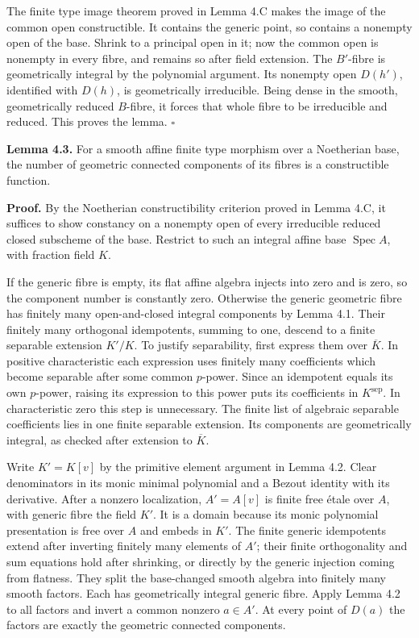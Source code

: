 \documentclass[11pt,a4paper,openany]{report}
\newcounter{none}
\begin{document}
The finite type image theorem proved in Lemma 4.C makes the image of the common open constructible. It contains the generic point, so contains a nonempty open of the base. Shrink to a principal open in it; now the common open is nonempty in every fibre, and remains so after field extension. The \(B'\)-fibre is geometrically integral by the polynomial argument. Its nonempty open \(D(h')\), identified with \(D(h)\), is geometrically irreducible. Being dense in the smooth, geometrically reduced \(B\)-fibre, it forces that whole fibre to be irreducible and reduced. This proves the lemma. \(\square\)

\textbf{Lemma 4.3.} For a smooth affine finite type morphism over a Noetherian base, the number of geometric connected components of its fibres is a constructible function.

\textbf{Proof.} By the Noetherian constructibility criterion proved in Lemma 4.C, it suffices to show constancy on a nonempty open of every irreducible reduced closed subscheme of the base. Restrict to such an integral affine base \(\operatorname{Spec}A\), with fraction field \(K\).

If the generic fibre is empty, its flat affine algebra injects into zero and is zero, so the component number is constantly zero. Otherwise the generic geometric fibre has finitely many open-and-closed integral components by Lemma 4.1. Their finitely many orthogonal idempotents, summing to one, descend to a finite separable extension \(K'/K\). To justify separability, first express them over \(\overline K\). In positive characteristic each expression uses finitely many coefficients which become separable after some common \(p\)-power. Since an idempotent equals its own \(p\)-power, raising its expression to this power puts its coefficients in \(K^{\mathrm{sep}}\). In characteristic zero this step is unnecessary. The finite list of algebraic separable coefficients lies in one finite separable extension. Its components are geometrically integral, as checked after extension to \(\overline K\).

Write \(K'=K[v]\) by the primitive element argument in Lemma 4.2. Clear denominators in its monic minimal polynomial and a Bezout identity with its derivative. After a nonzero localization, \(A'=A[v]\) is finite free étale over \(A\), with generic fibre the field \(K'\). It is a domain because its monic polynomial presentation is free over \(A\) and embeds in \(K'\). The finite generic idempotents extend after inverting finitely many elements of \(A'\); their finite orthogonality and sum equations hold after shrinking, or directly by the generic injection coming from flatness. They split the base-changed smooth algebra into finitely many smooth factors. Each has geometrically integral generic fibre. Apply Lemma 4.2 to all factors and invert a common nonzero \(a\in A'\). At every point of \(D(a)\) the factors are exactly the geometric connected components.
\end{document}
